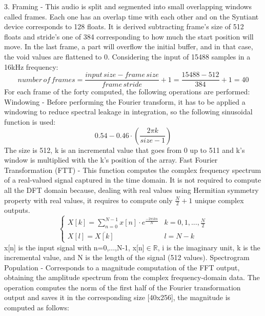 3. Framing - This audio is split and segmented into small overlapping windows called frames. Each one has an overlap time with each other and on the Syntiant device corresponds to 128 floats. It is derived subtracting frame's size of 512 floats and stride's one of 384 corresponding to how much the start position will move. In the last frame, a part will overflow the initial buffer, and in that case, the void values are flattened to 0. Considering the input of 15488 samples in a 16kHz frequency:\newline
\begin{equation}
    number\,of\,frames=\frac{input\,size-frame\,size}{frame\,stride}+1=\frac{15488-512}{384}+1=40
\end{equation}
For each frame of the forty computed, the following operations are performed: Windowing - Before performing the Fourier transform, it has to be applied a windowing to reduce spectral leakage in integration, so the following sinusoidal function is used:\newline
\begin{equation}
    0.54-0.46\cdot(\frac{2\pi k}{size-1})
\end{equation}
The size is 512, k is an incremental value that goes from 0 up to 511 and k's window is multiplied with the k's position of the array. Fast Fourier Transformation (FTT) - This function computes the complex frequency spectrum of a real-valued signal captured in the time domain. It is not required to compute all the DFT domain because, dealing with real values using Hermitian symmetry property with real values, it requires to compute only $\frac{N}{2}+1$ unique complex outputs. 
\begin{equation}
    \begin{cases} 
        X[k]=\sum_{n=0}^{N-1}x[n]\cdot e^{\frac{-2\pi ikn}{N}} & k=0,1,...,\frac{N}{2}\\
        X[l]=\overline{X[k]} & l=N-k
    \end{cases}
\end{equation}
x[n] is the input signal with n=0,...,N-1, x[n]$\in\mathbb{R}$, i is the imaginary unit, k is the incremental value, and N is the length of the signal (512 values). Spectrogram Population - Corresponds to a magnitude computation of the FFT output, obtaining the amplitude spectrum from the complex frequency-domain data. The operation computes the norm of the first half of the Fourier transformation output and saves it in the corresponding size [40x256], the magnitude is computed as follows:
